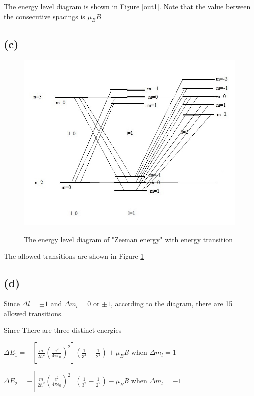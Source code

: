 \documentclass[12pt]{article}
\begin{document}
\begin{spacing}{2.0}
The energy level diagram is shown in Figure \ref{out1}. Note that the value between the consecutive spacings is $\mu_B B$

\subsection*{(c)}

\begin{figure}
  \centering
  \includegraphics[width=6in]{out2}\\
  \caption{The energy level diagram of "Zeeman energy" with energy transition}\label{out2}
\end{figure}

The allowed transitions are shown in Figure \ref{out2}

\subsection*{(d)}

Since $\Delta l=\pm 1$ and $\Delta m_l=0$ or $\pm 1$, according to the diagram, there are 15 allowed transitions. 

Since There are three distinct energies

$\Delta E_1= -\left[ \frac{m}{2\hbar^2} \left( \frac{e^2}{4\pi\epsilon_0} \right)^2 \right] \left(\frac{1}{3^2}-\frac{1}{2^2}\right) + \mu_B B$ when $\Delta m_l=1$

$\Delta E_2 = -\left[ \frac{m}{2\hbar^2} \left( \frac{e^2}{4\pi\epsilon_0} \right)^2 \right] \left(\frac{1}{3^2}-\frac{1}{2^2}\right) - \mu_B B$ when $\Delta m_l=-1$


\end{spacing}
\end{document}
